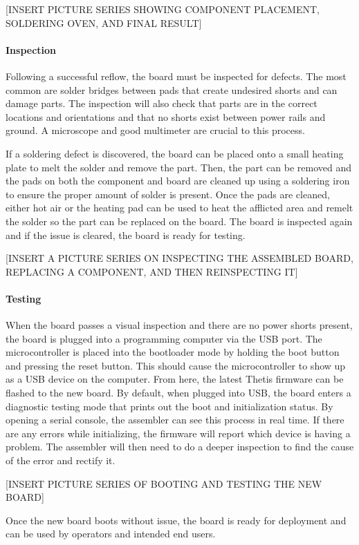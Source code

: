 [INSERT PICTURE SERIES SHOWING COMPONENT PLACEMENT, SOLDERING OVEN, AND FINAL RESULT]

\paragraph*{Inspection} Following a successful reflow, the board must be inspected for defects.
The most common are solder bridges between pads that create undesired shorts and can damage parts.
The inspection will also check that parts are in the correct locations and orientations and that no shorts exist between power rails and ground.
A microscope and good multimeter are crucial to this process.

If a soldering defect is discovered, the board can be placed onto a small heating plate to melt the solder and remove the part.
Then, the part can be removed and the pads on both the component and board are cleaned up using a soldering iron to ensure the proper amount of solder is present.
Once the pads are cleaned, either hot air or the heating pad can be used to heat the afflicted area and remelt the solder so the part can be replaced on the board.
The board is inspected again and if the issue is cleared, the board is ready for testing.

[INSERT A PICTURE SERIES ON INSPECTING THE ASSEMBLED BOARD, REPLACING A COMPONENT, AND THEN REINSPECTING IT]

\paragraph*{Testing} When the board passes a visual inspection and there are no power shorts present, the board is plugged into a programming computer via the USB port.
The microcontroller is placed into the bootloader mode by holding the boot button and pressing the reset button.
This should cause the microcontroller to show up as a USB device on the computer.
From here, the latest Thetis firmware can be flashed to the new board.
By default, when plugged into USB, the board enters a diagnostic testing mode that prints out the boot and initialization status.
By opening a serial console, the assembler can see this process in real time.
If there are any errors while initializing, the firmware will report which device is having a problem.
The assembler will then need to do a deeper inspection to find the cause of the error and rectify it.

[INSERT PICTURE SERIES OF BOOTING AND TESTING THE NEW BOARD]

Once the new board boots without issue, the board is ready for deployment and can be used by operators and intended end users.


